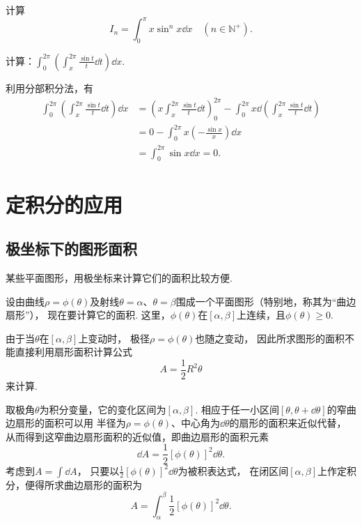 \begin{example}
计算\[
	I_n = \int_0^\pi x \sin^n x \dd{x}
	\quad(n\in\mathbb{N}^+).
\]
\end{example}

\begin{example}
计算：\(\int_0^{2\pi}\left(\int_x^{2\pi}\frac{\sin t}{t}\dd{t}\right)\dd{x}\).
\begin{solution}
利用分部积分法，有\begin{align*}
	\int_0^{2\pi}\left(\int_x^{2\pi}\frac{\sin t}{t}\dd{t}\right)\dd{x}
	&= \left(x \int_x^{2\pi}\frac{\sin t}{t}\dd{t}\right)_0^{2\pi}
	- \int_0^{2\pi} x \dd(\int_x^{2\pi}\frac{\sin t}{t}\dd{t}) \\
	&= 0 - \int_0^{2\pi} x \left(-\frac{\sin x}{x}\right) \dd{x} \\
	&= \int_0^{2\pi} \sin x \dd{x} = 0.
\end{align*}
\end{solution}
\end{example}

\section{定积分的应用}
\subsection{极坐标下的图形面积}
某些平面图形，用极坐标来计算它们的面积比较方便.

设由曲线\(\rho = \phi(\theta)\)及射线\(\theta=\alpha\)、\(\theta=\beta\)围成一个平面图形（特别地，称其为“曲边扇形”），
现在要计算它的面积.
这里，\(\phi(\theta)\)在\([\alpha,\beta]\)上连续，且\(\phi(\theta)\geq0\).

由于当\(\theta\)在\([\alpha,\beta]\)上变动时，
极径\(\rho=\phi(\theta)\)也随之变动，
因此所求图形的面积不能直接利用扇形面积计算公式\[
    A = \frac{1}{2} R^2 \theta
\]来计算.

取极角\(\theta\)为积分变量，它的变化区间为\([\alpha,\beta]\).
相应于任一小区间\([\theta,\theta+\dd{\theta}]\)的窄曲边扇形的面积可以用
半径为\(\rho=\phi(\theta)\)、中心角为\(\dd{\theta}\)的扇形的面积来近似代替，
从而得到这窄曲边扇形面积的近似值，即曲边扇形的面积元素\[
    \dd{A}
    = \frac{1}{2} [\phi(\theta)]^2 \dd{\theta}.
\]
考虑到\(A = \int \dd{A}\)，
只要以\(\frac{1}{2} [\phi(\theta)]^2 \dd{\theta}\)为被积表达式，
在闭区间\([\alpha,\beta]\)上作定积分，便得所求曲边扇形的面积为\[
A = \int_\alpha^\beta \frac{1}{2} [\phi(\theta)]^2 \dd{\theta}.
\]

